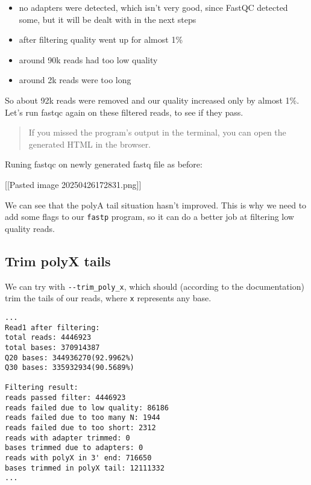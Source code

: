 \begin{itemize}
\tightlist
\item
  no adapters were detected, which isn't very good, since FastQC
  detected some, but it will be dealt with in the next steps
\item
  after filtering quality went up for almost 1\%
\item
  around 90k reads had too low quality
\item
  around 2k reads were too long
\end{itemize}

So about 92k reads were removed and our quality increased only by almost
1\%. Let's run fastqc again on these filtered reads, to see if they
pass.

\begin{quote}
If you missed the program's output in the terminal, you can open the
generated HTML in the browser.
\end{quote}

Runing fastqc on newly generated fastq file as before:

{[}{[}Pasted image 20250426172831.png{]}{]}

We can see that the polyA tail situation hasn't improved. This is why we
need to add some flags to our \texttt{fastp} program, so it can do a
better job at filtering low quality reads.

\hypertarget{trim-polyx-tails}{%
\subsection{Trim polyX tails}\label{trim-polyx-tails}}

We can try with \texttt{-\/-trim\_poly\_x}, which should (according to
the documentation) trim the tails of our reads, where \texttt{x}
represents any base.

\begin{Shaded}
\begin{Highlighting}[]
\end{Highlighting}
\end{Shaded}

\begin{verbatim}
...
Read1 after filtering:
total reads: 4446923
total bases: 370914387
Q20 bases: 344936270(92.9962%)
Q30 bases: 335932934(90.5689%)

Filtering result:
reads passed filter: 4446923
reads failed due to low quality: 86186
reads failed due to too many N: 1944
reads failed due to too short: 2312
reads with adapter trimmed: 0
bases trimmed due to adapters: 0
reads with polyX in 3' end: 716650
bases trimmed in polyX tail: 12111332
...
\end{verbatim}

